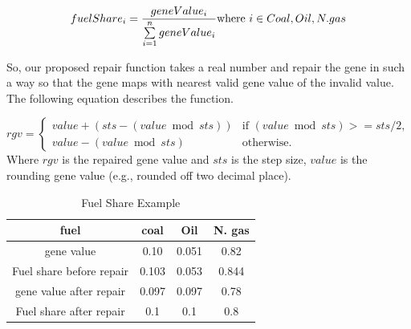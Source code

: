 \documentclass{article}
\begin{document}
\begin{equation}
\label{eq:Fuel Share}
fuelShare_i = \frac{geneValue_{i}}{\sum\limits_{i=1}^n geneValue_{i}} \\ \text{where }
i \in {Coal, Oil, N. gas}
\end{equation}  


So, our proposed repair function takes a real number and repair the gene in such a way so that the gene maps with nearest valid gene value of the invalid value. 
The following equation describes the function. 


\begin{equation*}
\label{eq:Representation of capacity design variables2}
rgv =
\begin{cases}
value + (sts - (value\bmod{sts})) & \text{if } (value \bmod{ sts}) >= sts/2, \\
value - (value \bmod{ sts}) & \text{otherwise}.
\end{cases}
\end{equation*}
Where $rgv$ is the repaired gene value and $sts$ is the step size, $value$ is the rounding gene value (e.g., rounded off two decimal place).


\begin{table}
\centering
\caption {Fuel Share Example}
\label{table:example fuel share}

\begin{tabular}{c|c|c|c}\hline
fuel & coal & Oil & N. gas \\ \hline
gene value& 0.10 & 0.051 & 0.82 \\ \hline
Fuel share before repair& 0.103 &0.053&0.844\\ \hline
gene value after repair & 0.097 & 0.097 & 0.78 \\ \hline
Fuel share after repair & 0.1 & 0.1 & 0.8 \\ \hline   

\end{tabular}
\end{table}
\end{document}
